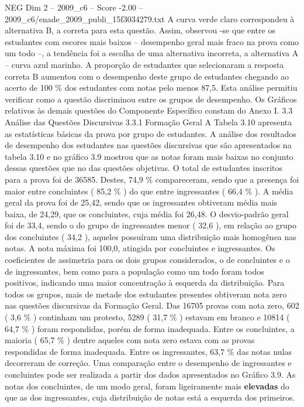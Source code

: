 \begin{textsample}{NEG Dim 2 – 2009\_c6 – Score -2.00 – 2009\_c6/enade\_2009\_publi\_15f3034279.txt}
A curva verde claro correspondeu à alternativa B, a correta para esta questão.
Assim, observou -se que entre os estudantes com escores mais baixos – desempenho geral mais fraco na prova como um todo –, a tendência foi a escolha de uma alternativa incorreta, a alternativa A – curva azul marinho.
A proporção de estudantes que selecionaram a resposta correta B aumentou com o desempenho deste grupo de estudantes chegando ao acerto de 100 \% dos estudantes com notas pelo menos 87,5.
Esta análise permitiu verificar como a questão discriminou entre os grupos de desempenho.
Os Gráficos relativos às demais questões do Componente Específico constam do Anexo I. 3.3 Análise das Questões Discursivas 3.3.1 Formação Geral A Tabela 3.10 apresenta as estatísticas básicas da prova por grupo de estudantes.
A análise dos resultados de desempenho dos estudantes nas questões discursivas que são apresentados na tabela 3.10 e no gráfico 3.9 mostrou que as notas foram mais baixas no conjunto dessas questões que no das questões objetivas.
O total de estudantes inscritos para a prova foi de 36585.
Destes, 74,9 \% compareceram, sendo que a presença foi maior entre concluintes ( 85,2 \% ) do que entre ingressantes ( 66,4 \% ).
A média geral da prova foi de 25,42, sendo que os ingressantes obtiveram média mais baixa, de 24,29, que os concluintes, cuja média foi 26,48.
O desvio-padrão geral foi de 33,4, sendo o do grupo de ingressantes menor ( 32,6 ), em relação ao grupo dos concluintes ( 34,2 ), aqueles possuíram uma distribuição mais homogênea nas notas.
A nota máxima foi 100,0, atingida por concluintes e ingressantes.
Os coeficientes de assimetria para os dois grupos considerados, o de concluintes e o de ingressantes, bem como para a população como um todo foram todos positivos, indicando uma maior concentração à esquerda da distribuição.
Para todos os grupos, mais de metade dos estudantes presentes obtiveram nota zero nas questões discursivas da Formação Geral.
Das 16705 provas com nota zero, 602 ( 3,6 \% ) continham um protesto, 5289 ( 31,7 \% ) estavam em branco e 10814 ( 64,7 \% ) foram respondidas, porém de forma inadequada.
Entre os concluintes, a maioria ( 65,7 \% ) dentre aqueles com nota zero estava com as provas respondidas de forma inadequada.
Entre os ingressantes, 63,7 \% das notas nulas decorreram de correção.
Uma comparação entre o desempenho de ingressantes e concluintes pode ser realizada a partir dos dados apresentados no Gráfico 3.9.
As notas dos concluintes, de um modo geral, foram ligeiramente mais \textbf{elevadas} do que as dos ingressantes, cuja distribuição de notas está a esquerda dos primeiros.

\end{textsample}
